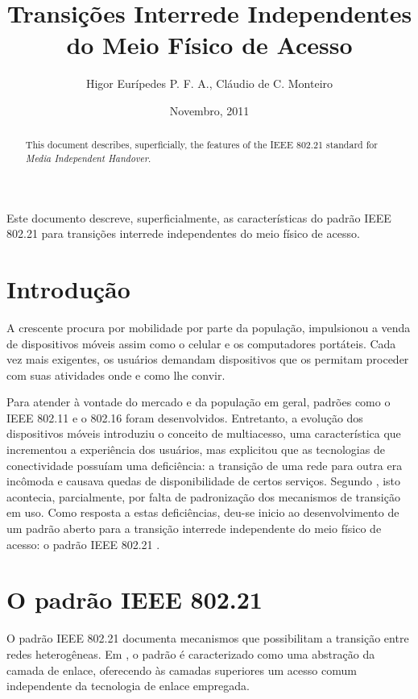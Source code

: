 \documentclass[12pt]{article}
\title{Transições Interrede Independentes do Meio Físico de Acesso}
\author{Higor Eurípedes P. F. A.\inst{1}, Cláudio de C. Monteiro\inst{1}}
\date{Novembro, 2011}
\begin{document}
\maketitle

\begin{abstract}

This document describes, superficially, the features of the IEEE 802.21 
standard for \textit{Media Independent Handover}.

\end{abstract}
     
\begin{resumo}

Este documento descreve, superficialmente, as características do padrão
IEEE 802.21 para transições interrede independentes do meio físico de acesso.

\end{resumo}


\section{Introdução}

A crescente procura por mobilidade por parte da população, impulsionou a venda 
de dispositivos móveis assim como o celular e os computadores portáteis. Cada 
vez mais exigentes, os usuários demandam dispositivos que os permitam proceder 
com suas atividades onde e como lhe convir.

Para atender à vontade do mercado e da população em geral, padrões como o
IEEE 802.11\cite{ieee:2007:80211} e o 802.16\cite{ieee:2009:80216} foram 
desenvolvidos.  Entretanto, a evolução dos dispositivos móveis introduziu o 
conceito de multiacesso, uma característica que incrementou a experiência dos 
usuários, mas explicitou que as tecnologias de conectividade possuíam uma 
deficiência: a transição de uma rede para outra era incômoda e causava quedas 
de disponibilidade de certos serviços. Segundo \cite{piri:2009}, isto 
acontecia, parcialmente, por falta de padronização dos mecanismos de transição 
em uso.  Como resposta a estas deficiências, deu-se inicio ao desenvolvimento 
de um padrão aberto para a transição interrede independente do meio físico de 
acesso: o padrão IEEE 802.21 \cite{ieee:2008:80221}.

\section{O padrão IEEE 802.21}

O padrão IEEE 802.21 documenta mecanismos que possibilitam a transição entre 
redes heterogêneas.  Em \cite{idigital:2009}, o padrão é caracterizado como 
uma abstração da camada de enlace, oferecendo às camadas superiores um acesso 
comum independente da tecnologia de enlace empregada.
\end{document}
